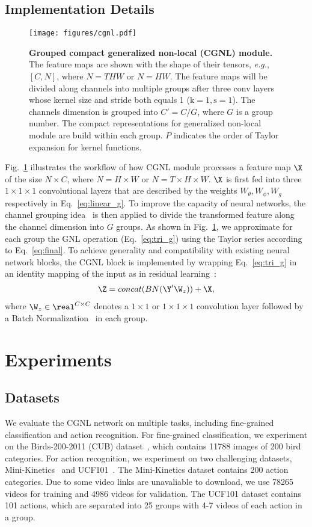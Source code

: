 \documentclass{article}
\begin{document}
\subsection{Implementation Details}
\begin{figure}[H]
  \centering
  \texttt{[image: figures/cgnl.pdf]}
  \caption{\small{
    \textbf{Grouped compact generalized non-local (CGNL) module.}
    The feature maps are shown with the shape of their tensors, \textit{e.g.}, $[C,N]$, where $N = THW$ or $N=HW$.
    The feature maps will be divided along channels into multiple groups after three conv layers whose kernel size and stride both equals 1 ($\text{k}=1, \text{s}=1$).
    The channels dimension is grouped into $C'=C/G$, where $G$ is a group number.
    The compact representations for generalized non-local module are build within each group.
    $P$ indicates the order of Taylor expansion for kernel functions.
  }}
  \label{fig:cgnl}
\end{figure}
Fig.~\ref{fig:cgnl} illustrates the workflow of how CGNL module processes a feature map $\X$ of the size $N \times C$, where $N = H \times W$ or $N = T \times H \times W$.
$\X$ is first fed into three $1 \times 1 \times 1$ convolutional layers that are described by the weights $W_\theta, W_\phi, W_g$ respectively in Eq.~\ref{eq:linear_g}.
To improve the capacity of neural networks, the channel grouping idea~\cite{resnext,gn} is then applied to divide the transformed feature along the channel dimension into $G$ groups.
As shown in Fig.~\ref{fig:cgnl}, we approximate for each group the GNL operation (Eq.~\ref{eq:tri_g}) using the Taylor series according to Eq.~\ref{eq:final}.
To achieve generality and compatibility with existing neural network blocks, the CGNL block is implemented by wrapping Eq.~\ref{eq:tri_g} in an identity mapping of the input as in residual learning~\cite{resnet}:
\begin{align}
\label{eq:cgnl residual output}
  \Z = concat(BN(\Y' \W_z)) + \X,
\end{align}
where $\W_z \in \real^{C \times C}$ denotes a $1 \times 1$ or $1 \times 1 \times 1$ convolution layer followed by a Batch Normalization~\cite{bn} in each group.
\section{Experiments}
\label{sec:experiments}
\subsection{Datasets}
We evaluate the CGNL network on multiple tasks, including fine-grained classification and action recognition.
For fine-grained classification, we experiment on the Birds-200-2011 (CUB) dataset~\cite{welinder2010caltech}, which contains 11788 images of 200 bird categories.
For action recognition, we experiment on two challenging datasets, Mini-Kinetics~\cite{mini-kinetics} and UCF101~\cite{ucf101}.
The Mini-Kinetics dataset contains 200 action categories.
Due to some video links are unavaliable to download, we use 78265 videos for training and 4986 videos for validation.
The UCF101 dataset contains 101 actions, which are separated into 25 groups with 4-7 videos of each action in a group.
\end{document}
